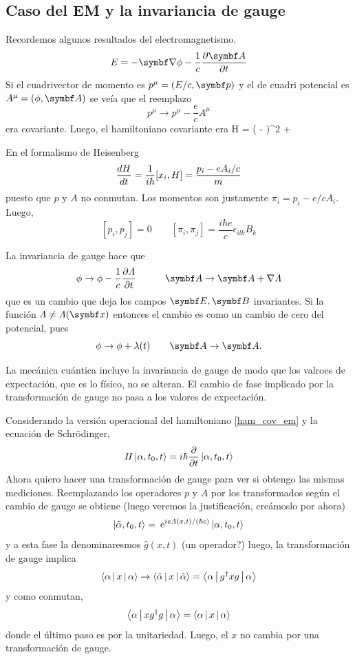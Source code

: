 \documentclass[10pt,oneside]{CBFT_book}
\begin{document}
\subsection{Caso del EM y la invariancia de gauge}

Recordemos algunos resultados del electromagnetismo.
\[
	E = - \Nabla\phi - \frac{1}{c}\dpar{\vb{A}}{t}
\]
Si el cuadrivector de momento es $p^\mu = (E/c, \vb p)$ y el de cuadri potencial es $A^\mu =(\phi,\vb A)$
se veía que el reemplazo
\[
	p^\mu \to p^\mu - \frac{e}{c} A^\mu
\]
era covariante.
Luego, el hamiltoniano covariante era
\be
	H =  \left(  - \right)^2 + \euler \phi 
	\label{ham_cov_em}
\ee

En el formalismo de Heisenberg
\[
	\frac{d^{\hspace{-0.05em}} {H}}{d {t}^{\hspace{-0.05em}}} = \frac{1}{i\hbar}[x_i,H] = \frac{p_i - e A_i / c}{m}
\]
puesto que $p$ y $A$ no conmutan. Los momentos son justamente $\pi_i = p_i - e/c A_i$.
Luego,
\[
	[ p_i, p_j ] = 0 \qquad 
	[ \pi_i , \pi_j ] = \frac{i\hbar e}{c} \epsilon_{i l k}B_k
\]

La invariancia de gauge hace que
\[
	\phi \to \phi - \frac{1}{c}\dpar{\Lambda}{t} \qquad \quad 
	\vb A \to \vb A + \nabla \Lambda
\]
que es un cambio que deja los campos $\vb E, \vb B$ invariantes. Si la función $\Lambda \neq \Lambda(\vb x)$
entonces el cambio es como un cambio de cero del potencial, pues 
\[
	\phi \to \phi + \lambda(t) \qquad \vb A \to \vb A.
\]

La mecánica cuántica incluye la invariancia de gauge de modo que los valroes de expectación, que es lo
físico, no se alteran.
El cambio de fase implicado por la transformación de gauge no pasa a los valores de expectación.

Considerando la versión operacional del hamiltoniano \eqref{ham_cov_em} y la ecuación de Schrödinger,
\[
	H \Ket{\alpha,t_0,t} = i \hbar \frac{\partial^{\hspace{-0.05em}} {}}{\partial {t}^{\hspace{-0.05em}}} \Ket{\alpha,t_0,t}
\]
Ahora quiero hacer una transformación de gauge para ver si obtengo las mismas mediciones.
Reemplazando los operadores $p$ y $A$ por los transformados según el cambio de gauge se obtiene
(luego veremos la justificación, creámoslo por ahora)
\[
	\Ket{\tilde{\alpha},t_0,t} = \:\mathrm{e}^{ i e \Lambda(x,t)/(\hbar c)}\Ket{\alpha,t_0,t} 
\]
y a esta fase la denominaresmos $\hat{g}(x,t)$ (un operador?) luego, la transformación de gauge implica
\[
	\Braket{\alpha|x|\alpha} \to  \Braket{\tilde{\alpha}|x|\tilde{\alpha}} = \Braket{\alpha|g^\dagger x g|\alpha}
\]
y como conmutan,
\[
	\Braket{\alpha|x g^\dagger g|\alpha} = \Braket{\alpha|x|\alpha}
\]
donde el último paso es por la unitariedad. Luego, el $x$ no cambia por una transformación de gauge.
\end{document}
